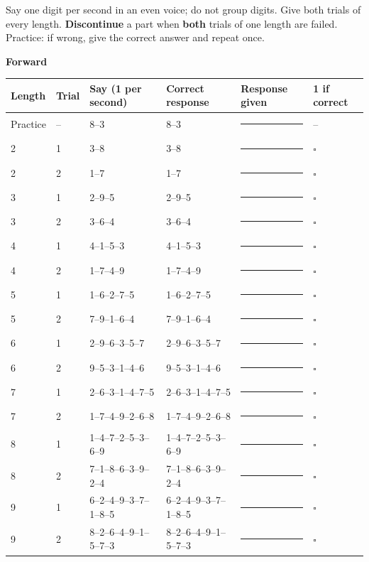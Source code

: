 \documentclass[10pt,a4paper]{article}
\newcommand{\blank}[1][1.2cm]{\rule{#1}{0.4pt}}
\newcommand{\bx}{$\square$}
\begin{document}
Say one digit per second in an even voice; do not group digits. Give both trials of every length. \textbf{Discontinue} a part when \textbf{both} trials of one length are failed. Practice: if wrong, give the correct answer and repeat once.
\par{}\medskip\textbf{Forward}\par\begin{longtable}{@{}llp{4.2cm}p{4.2cm}p{3.4cm}l@{}}\toprule Length & Trial & Say (1 per second) & Correct response & Response given & 1 if correct\\ \midrule\endhead
Practice & -- & 8--3 & 8--3 & \blank[3.2cm] & --\\ \midrule
2 & 1 & 3--8 & 3--8 & \blank[3.2cm] & \bx\\
2 & 2 & 1--7 & 1--7 & \blank[3.2cm] & \bx\\\midrule
3 & 1 & 2--9--5 & 2--9--5 & \blank[3.2cm] & \bx\\
3 & 2 & 3--6--4 & 3--6--4 & \blank[3.2cm] & \bx\\\midrule
4 & 1 & 4--1--5--3 & 4--1--5--3 & \blank[3.2cm] & \bx\\
4 & 2 & 1--7--4--9 & 1--7--4--9 & \blank[3.2cm] & \bx\\\midrule
5 & 1 & 1--6--2--7--5 & 1--6--2--7--5 & \blank[3.2cm] & \bx\\
5 & 2 & 7--9--1--6--4 & 7--9--1--6--4 & \blank[3.2cm] & \bx\\\midrule
6 & 1 & 2--9--6--3--5--7 & 2--9--6--3--5--7 & \blank[3.2cm] & \bx\\
6 & 2 & 9--5--3--1--4--6 & 9--5--3--1--4--6 & \blank[3.2cm] & \bx\\\midrule
7 & 1 & 2--6--3--1--4--7--5 & 2--6--3--1--4--7--5 & \blank[3.2cm] & \bx\\
7 & 2 & 1--7--4--9--2--6--8 & 1--7--4--9--2--6--8 & \blank[3.2cm] & \bx\\\midrule
8 & 1 & 1--4--7--2--5--3--6--9 & 1--4--7--2--5--3--6--9 & \blank[3.2cm] & \bx\\
8 & 2 & 7--1--8--6--3--9--2--4 & 7--1--8--6--3--9--2--4 & \blank[3.2cm] & \bx\\\midrule
9 & 1 & 6--2--4--9--3--7--1--8--5 & 6--2--4--9--3--7--1--8--5 & \blank[3.2cm] & \bx\\
9 & 2 & 8--2--6--4--9--1--5--7--3 & 8--2--6--4--9--1--5--7--3 & \blank[3.2cm] & \bx\\\midrule
\bottomrule\end{longtable}
\end{document}
